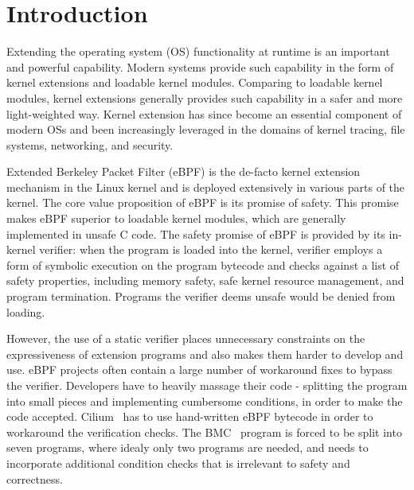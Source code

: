 \section{Introduction}

Extending the operating system (OS) functionality at runtime is an
    important and powerful capability.
Modern systems provide such capability in the form of kernel extensions and
    loadable kernel modules.
Comparing to loadable kernel modules, kernel extensions generally provides such
    capability in a safer and more light-weighted way.
Kernel extension has since become an essential component of modern OSs and
    been increasingly leveraged in the domains of kernel tracing, file systems,
    networking, and security.

Extended Berkeley Packet Filter (eBPF) is the de-facto kernel extension
    mechanism in the Linux kernel and is deployed extensively in various
    parts of the kernel.
The core value proposition of eBPF is its promise of safety.
This promise makes eBPF superior to loadable kernel modules, which are
    generally implemented in unsafe C code.
The safety promise of eBPF is provided by its in-kernel verifier:
when the program is loaded into the kernel, verifier employs a form of symbolic
    execution on the program bytecode and checks against a list of safety
    properties, including memory safety, safe kernel resource management, and
    program termination.
Programs the verifier deems unsafe would be denied from loading.

However, the use of a static verifier places unnecessary constraints on the
    expressiveness of extension programs and also makes them harder to develop
    and use.
eBPF projects often contain a large number of workaround fixes to bypass the
    verifier.
Developers have to heavily massage their code - splitting the program
    into small pieces and implementing cumbersome conditions, in order to
    make the code accepted.
Cilium~\cite{cilium} has to use hand-written eBPF bytecode in order to
    workaround the verification checks.
The BMC~\cite{BMC} program is forced to be split into seven
    programs, where idealy only two programs are needed, and needs to
    incorporate additional condition checks that is irrelevant to safety and
    correctness.

